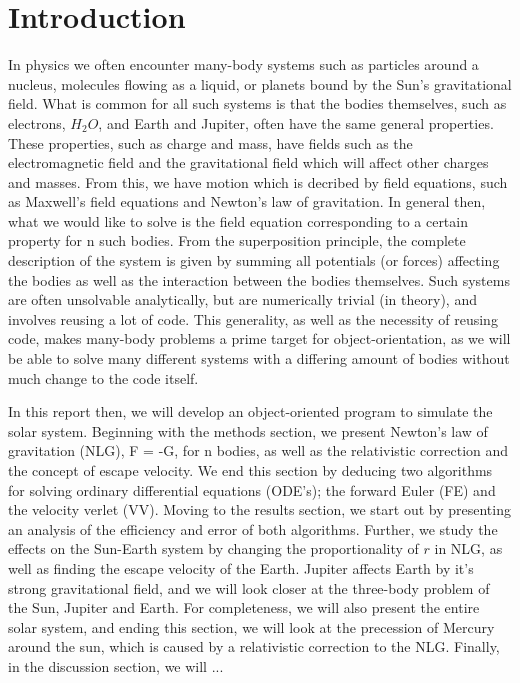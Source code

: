 \section{Introduction}
\label{sec:introduction}

In physics we often encounter many-body systems such as particles around a nucleus,
molecules flowing as a liquid, or planets bound by the Sun's gravitational field.
What is common for all such systems is that the bodies themselves, such as
electrons, $H_2 O$, and Earth and Jupiter, often have the same general properties.
These properties, such as charge and mass, have fields such as the electromagnetic field
and the gravitational field which will affect other charges and masses. From this,
we have motion which is decribed by field equations, such as Maxwell's field equations
and Newton's law of gravitation. In general then, what we would like to solve is
the field equation corresponding to a certain property for n such bodies. From
the superposition principle, the complete description of the system is given by
summing all potentials (or forces) affecting the bodies as well as the interaction
between the bodies themselves. Such systems are often unsolvable analytically, but are
numerically trivial (in theory), and involves reusing a lot of code. This generality,
as well as the necessity of reusing code, makes many-body problems a prime target
for object-orientation, as we will be able to solve many different systems with
a differing amount of bodies without much change to the code itself.

In this report then, we will develop an object-oriented program to simulate the
solar system. Beginning with the methods section, we present Newton's law of gravitation (NLG),
  F = -G,
for n bodies, as well as the relativistic correction and the concept of escape velocity.
We end this section by deducing two algorithms for solving ordinary differential equations (ODE's);
the forward Euler (FE) and the velocity verlet (VV). Moving to the results section, we start out
by presenting an analysis of the efficiency and error of both algorithms. Further,
we study the effects on the Sun-Earth system by changing the proportionality of $r$ in NLG,
as well as finding the escape velocity of the Earth. Jupiter affects Earth by it's strong gravitational field,
and we will look closer at the three-body problem of the Sun, Jupiter and Earth. For completeness,
we will also present the entire solar system, and ending this section, we will
look at the precession of Mercury around the sun, which is caused by a relativistic correction
to the NLG. Finally, in the discussion section, we will ...

